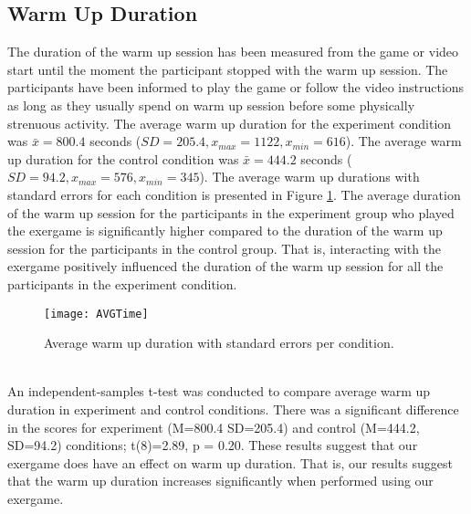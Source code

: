 \subsection{Warm Up Duration}
The duration of the warm up session has been measured from the game or video start until the moment the participant stopped with the warm up session. The participants have been informed to play the game or follow the video instructions as long as they usually spend on warm up session before some physically strenuous activity. The average warm up duration for the experiment condition was \begin{math}\bar{x} = 800.4 \end{math} seconds (\begin{math} SD = 205.4, x_{max}=1122, x_{min}=616 \end{math}). The average warm up duration for the control condition was \begin{math}\bar{x} = 444.2 \end{math} seconds (\begin{math} SD = 94.2, x_{max}= 576, x_{min}= 345\end{math}). The average warm up durations with standard errors for each condition is presented in Figure \ref{fig:wuduration}. The average duration of the warm up session for the participants in the experiment group who played the exergame is significantly higher compared to the duration of the warm up session for the participants in the control group. That is, interacting with the exergame positively influenced the duration of the warm up session for all the participants in the experiment condition.\\
\begin{figure}[h]
    \centering
    \texttt{[image: AVGTime]}
    \caption{Average warm up duration with standard errors per condition.}
    \label{fig:wuduration}
\end{figure}\\
An independent-samples t-test was conducted to compare average warm up duration in experiment and control conditions. There was a significant difference in the scores for experiment (M=800.4 SD=205.4) and control (M=444.2, SD=94.2) conditions; t(8)=2.89, p = 0.20. These results suggest that our exergame does have an effect on warm up duration. That is, our results suggest that the warm up duration increases significantly when performed using our exergame. 
